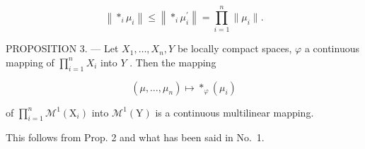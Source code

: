 \[
\left\| \ast_ {i} \mu_ {i} \right\| \leqslant \left\| \ast_ {i} \mu_ {i} ^ {\prime} \right\| = \prod_ {i = 1} ^ {n} \| \mu_ {i} \|.
\]

PROPOSITION 3. --- Let \(X_1, \ldots, X_n, Y\) be locally compact spaces, \(\varphi\) a continuous mapping of \(\prod_{i=1}^{n} X_i\) into \(Y\) . Then the mapping

\[
(\mu , \dots , \mu_ {n}) \mapsto * _ {\varphi} (\mu_ {i})
\]

of \(\prod_{i=1}^{n} \mathcal{M}^1(\mathrm{X}_i)\) into \(\mathcal{M}^1(\mathrm{Y})\) is a continuous multilinear mapping.

This follows from Prop. 2 and what has been said in No.~1.

